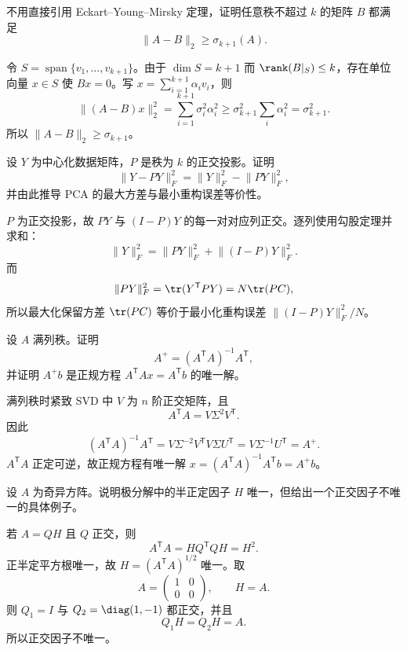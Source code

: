 \begin{exercise}[level=advanced]
不用直接引用 Eckart--Young--Mirsky 定理，证明任意秩不超过 $k$ 的矩阵 $B$ 都满足
\[
\lVert A-B\rVert_2\ge\sigma_{k+1}(A).
\]
\begin{solution}
令 $S=\operatorname{span}\{v_1,\ldots,v_{k+1}\}$。由于 $\dim S=k+1$ 而 $\rank(B|_S)\le k$，存在单位向量 $x\in S$ 使 $Bx=0$。写 $x=\sum_{i=1}^{k+1}\alpha_iv_i$，则
\[
\lVert(A-B)x\rVert_2^2
=\sum_{i=1}^{k+1}\sigma_i^2\alpha_i^2
\ge\sigma_{k+1}^2\sum_i\alpha_i^2
=\sigma_{k+1}^2.
\]
所以 $\lVert A-B\rVert_2\ge\sigma_{k+1}$。
\end{solution}
\end{exercise}

\begin{exercise}[level=advanced]
设 $Y$ 为中心化数据矩阵，$P$ 是秩为 $k$ 的正交投影。证明
\[
\lVert Y-PY\rVert_F^2
=\lVert Y\rVert_F^2-\lVert PY\rVert_F^2,
\]
并由此推导 PCA 的最大方差与最小重构误差等价性。
\begin{solution}
$P$ 为正交投影，故 $PY$ 与 $(I-P)Y$ 的每一对对应列正交。逐列使用勾股定理并求和：
\[
\lVert Y\rVert_F^2
=\lVert PY\rVert_F^2+\lVert(I-P)Y\rVert_F^2.
\]
而
\[
\lVert PY\rVert_F^2
=\tr(Y^{\mathsf T}PY)
=N\tr(PC),
\]
所以最大化保留方差 $\tr(PC)$ 等价于最小化重构误差 $\lVert(I-P)Y\rVert_F^2/N$。
\end{solution}
\end{exercise}

\begin{exercise}[level=advanced]
设 $A$ 满列秩。证明
\[
A^+=(A^{\mathsf T}A)^{-1}A^{\mathsf T},
\]
并证明 $A^+b$ 是正规方程 $A^{\mathsf T}Ax=A^{\mathsf T}b$ 的唯一解。
\begin{solution}
满列秩时紧致 SVD 中 $V$ 为 $n$ 阶正交矩阵，且
\[
A^{\mathsf T}A=V\Sigma^2V^{\mathsf T}.
\]
因此
\[
(A^{\mathsf T}A)^{-1}A^{\mathsf T}
=V\Sigma^{-2}V^{\mathsf T}V\Sigma U^{\mathsf T}
=V\Sigma^{-1}U^{\mathsf T}=A^+.
\]
$A^{\mathsf T}A$ 正定可逆，故正规方程有唯一解
$x=(A^{\mathsf T}A)^{-1}A^{\mathsf T}b=A^+b$。
\end{solution}
\end{exercise}

\begin{exercise}[level=advanced]
设 $A$ 为奇异方阵。说明极分解中的半正定因子 $H$ 唯一，但给出一个正交因子不唯一的具体例子。
\begin{solution}
若 $A=QH$ 且 $Q$ 正交，则
\[
A^{\mathsf T}A=H Q^{\mathsf T}QH=H^2.
\]
正半定平方根唯一，故 $H=(A^{\mathsf T}A)^{1/2}$ 唯一。取
\[
A=\begin{pmatrix}1&0\\0&0\end{pmatrix},
\qquad H=A.
\]
则 $Q_1=I$ 与 $Q_2=\diag(1,-1)$ 都正交，并且
\[
Q_1H=Q_2H=A.
\]
所以正交因子不唯一。
\end{solution}
\end{exercise}

